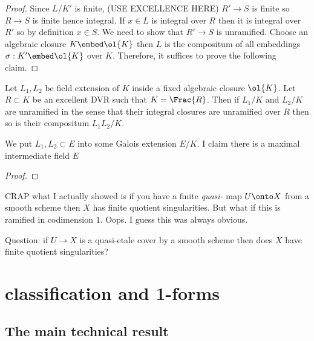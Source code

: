 \documentclass[12pt]{article}
\theoremstyle{plain}
\begin{document}
\begin{proof}
Since $L/K'$ is finite, (USE EXCELLENCE HERE) $R' \to S$ is finite so $R \to S$ is finite hence integral. If $x \in L$ is integral over $R$ then it is integral over $R'$ so by definition $x \in S$. We need to show that $R' \to S$ is unramified. Choose an algebraic closure $K \embed \ol{K}$ then $L$ is the compositum of all embeddings $\sigma : K' \embed \ol{K}$ over $K$. Therefore, it suffices to prove the following claim.
\end{proof}

\begin{lemma}
Let $L_1, L_2$ be field extension of $K$ inside a fixed algebraic closure $\ol{K}$. Let $R \subset K$ be an excellent DVR such that $K = \Frac{R}$. Then if $L_1 / K$ and $L_2 / K$ are unramified in the sense that their integral closures are unramified over $R$ then so is their compositum $L_1 L_2 / K$.
\end{lemma}

\begin{lemma}
We put $L_1, L_2 \subset E$ into some Galois extension $E / K$. I claim there is a maximal intermediate field $E $ 
\end{lemma}

\begin{proof}

\end{proof}

CRAP what I actually showed is if you have a finite \textit{quasi-\etale} map $U \onto X$ from a smooth scheme then $X$ has finite quotient singularities. But what if this is ramified in codimension $1$. Oops. I guess this was always obvious.


Question: if $U \to X$ is a quasi-etale cover by a smooth scheme then does $X$ have finite quotient singularities?

\section{classification and 1-forms}


\subsection{The main technical result}
\end{document}
